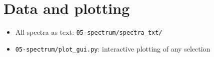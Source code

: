 \documentclass[11pt,a4paper]{article}
\begin{document}
\section*{Data and plotting}

\begin{itemize}\itemsep2pt
  \item All spectra as text: \texttt{05-spectrum/spectra\_txt/}
  \item \texttt{05-spectrum/plot\_gui.py}: interactive plotting of any selection
\end{itemize}
\end{document}
